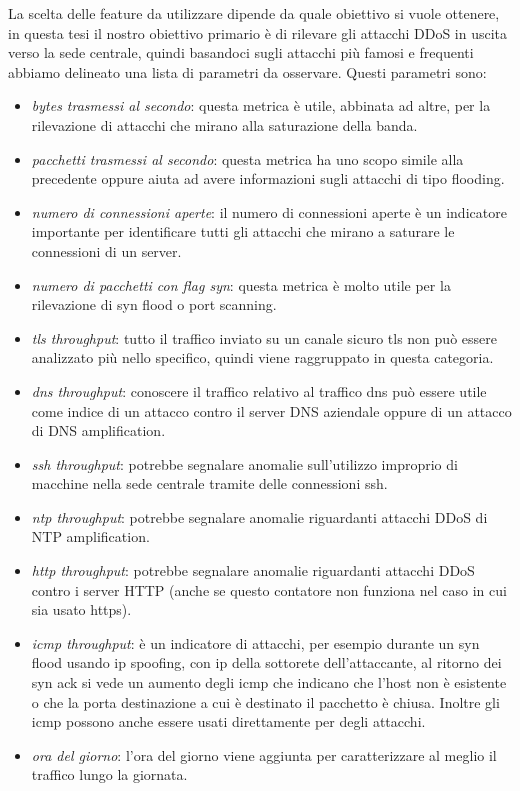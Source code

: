 La scelta delle feature da utilizzare dipende da quale obiettivo si vuole ottenere, in questa tesi il nostro obiettivo primario è di rilevare gli attacchi DDoS in uscita verso la sede centrale, quindi basandoci sugli attacchi più famosi e frequenti abbiamo delineato una lista di parametri da osservare. Questi parametri sono:
\begin{itemize}
    \item \emph{bytes trasmessi al secondo}: questa metrica è utile, abbinata ad altre, per la rilevazione di attacchi che mirano alla saturazione della banda.
    \item \emph{pacchetti trasmessi al secondo}: questa metrica ha uno scopo simile alla precedente oppure aiuta ad avere informazioni sugli attacchi di tipo flooding.
    \item \emph{numero di connessioni aperte}: il numero di connessioni aperte è un indicatore importante per identificare tutti gli attacchi che mirano a saturare le connessioni di un server.
    \item \emph{numero di pacchetti con flag syn}: questa metrica è molto utile per la rilevazione di syn flood o port scanning.
    \item \emph{tls throughput}: tutto il traffico inviato su un canale sicuro tls non può essere analizzato più nello specifico, quindi viene raggruppato in questa categoria.
    \item \emph{dns throughput}: conoscere il traffico relativo al traffico dns può essere utile come indice di un attacco contro il server DNS aziendale oppure di un attacco di DNS amplification.
    \item \emph{ssh throughput}: potrebbe segnalare anomalie sull'utilizzo improprio di macchine nella sede centrale tramite delle connessioni ssh.
    \item \emph{ntp throughput}: potrebbe segnalare anomalie riguardanti attacchi DDoS di NTP amplification.
    \item \emph{http throughput}: potrebbe segnalare anomalie riguardanti attacchi DDoS contro i server HTTP (anche se questo contatore non funziona nel caso in cui sia usato https).
    \item \emph{icmp throughput}: è un indicatore di attacchi, per esempio durante un syn flood usando ip spoofing, con ip della sottorete dell'attaccante, al ritorno dei syn ack si vede un aumento degli icmp che indicano che l'host non è esistente o che la porta destinazione a cui è destinato il pacchetto è chiusa. Inoltre gli icmp possono anche essere usati direttamente per degli attacchi.
    \item \emph{ora del giorno}: l'ora del giorno viene aggiunta per caratterizzare al meglio il traffico lungo la giornata.
\end{itemize}

